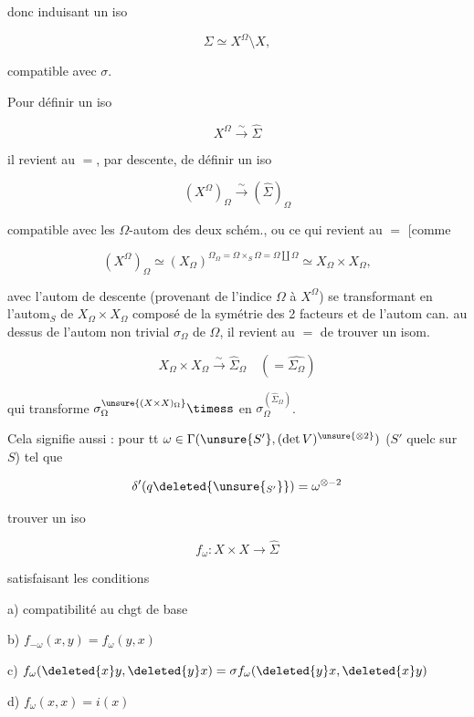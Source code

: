 donc induisant un iso

\[
\Sigma\simeq X^\Omega\setminus X,
\]

compatible avec $\sigma$.


Pour définir un iso

\[
X^\Omega\xrightarrow{\sim}\hat\Sigma
\]

il revient au $=$, par descente, de définir un iso

\[
(X^\Omega)_\Omega\xrightarrow{\sim}(\hat\Sigma)_\Omega
\]

compatible avec les $\Omega$-autom des deux schém., ou ce qui revient au $=$ [comme

\[
(X^\Omega)_\Omega\simeq(X_\Omega)^{\Omega_\Omega=\Omega\times_S\Omega=\Omega\amalg\Omega}\simeq X_\Omega\times X_\Omega,
\]

avec l'autom de descente (provenant de l'indice $\Omega$ à $X^\Omega$) se transformant en  l'autom$_{\!S}$ de $X_\Omega\times X_\Omega$ composé de la symétrie des 2 facteurs et de l'autom can. au dessus de l'autom non trivial $\sigma_\Omega$ de $\Omega$, il revient au $=$ de trouver un isom.

\[
X_\Omega\times X_\Omega\xrightarrow{\sim}\hat\Sigma_\Omega\quad(=\widehat{\Sigma_\Omega})
\]

qui transforme $\sigma_\Omega^{\unsure{(X\times X)_\Omega}}\timess$ en $\sigma_\Omega^{(\hat\Sigma_\Omega)}$.

Cela signifie aussi : pour tt $\omega\in\Gamma(\unsure{S'},(\det V)^{\unsure{\otimes2}})$ ($S'$ quelc sur $S$) tel que

\[
\delta'(q\deleted{\unsure{_{S'}}})=\omega^{\otimes-2}
\]

trouver un iso

\[
f_\omega:X\times X\longrightarrow\hat\Sigma\tag*{$(*)$}
\]

 satisfaisant les conditions


a) compatibilité au chgt de base

b)  \hfill $f_{-\omega}(x,y)=f_\omega(y,x)$

c) $f_\omega(\deleted{x}y,\deleted{y}x)=\sigma f_\omega(\deleted{y}x,\deleted{x}y)$

d) $f_\omega(x,x)=i(x)$


